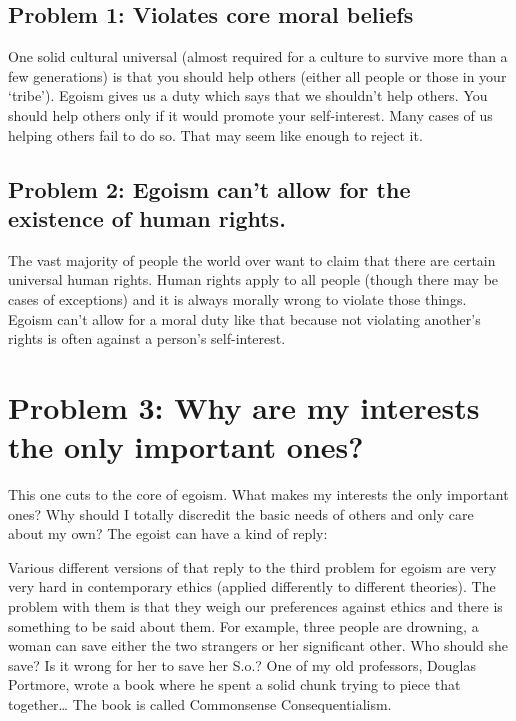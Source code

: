 \subsection{Problem 1: Violates core moral beliefs}

One solid cultural universal (almost required for a culture to survive more than a few generations) is that you should help others (either all people or those in your ‘tribe’). Egoism gives us a duty which says that we shouldn’t help others. You should help others only if it would promote your self-interest. Many cases of us helping others fail to do so. That may seem like enough to reject it.
\subsection{Problem 2: Egoism can’t allow for the existence of human rights.}

The vast majority of people the world over want to claim that there are certain universal human rights. Human rights apply to all people (though there may be cases of exceptions) and it is always morally wrong to violate those things. Egoism can’t allow for a moral duty like that because not violating another’s rights is often against a person’s self-interest. 
\section{Problem 3: Why are my interests the only important ones?}

This one cuts to the core of egoism. What makes my interests the only important ones? Why should I totally discredit the basic needs of others and only care about my own? The egoist can have a kind of reply:


Various different versions of that reply to the third problem for egoism are very very hard in contemporary ethics (applied differently to different theories). The problem with them is that they weigh our preferences against ethics and there is something to be said about them. For example, three people are drowning, a woman can save either the two strangers or her significant other. Who should she save? Is it wrong for her to save her S.o.? One of my old professors, Douglas Portmore,  wrote a book where he spent a solid chunk trying to piece that together… The book is called Commonsense Consequentialism.